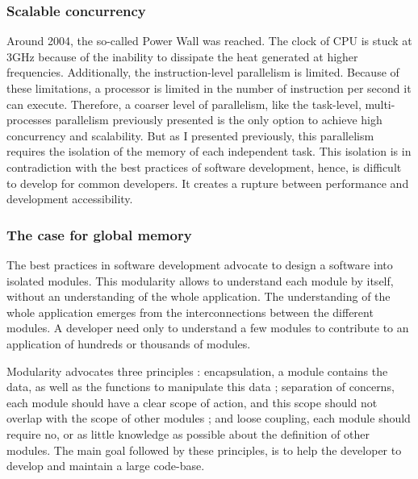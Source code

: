 
\subsubsection{Scalable concurrency}

Around 2004, the so-called Power Wall was reached.
The clock of CPU is stuck at 3GHz because of the inability to dissipate the heat generated at higher frequencies.
Additionally, the instruction-level parallelism is limited.
Because of these limitations, a processor is limited in the number of instruction per second it can execute.
Therefore, a coarser level of parallelism, like the task-level, multi-processes parallelism previously presented is the only option to achieve high concurrency and scalability.
But as I presented previously, this parallelism requires the isolation of the memory of each independent task.
This isolation is in contradiction with the best practices of software development, hence, is difficult to develop for common developers.
It creates a rupture between performance and development accessibility.

\subsubsection{The case for global memory}

The best practices in software development advocate to design a software into isolated modules.
This modularity allows to understand each module by itself, without an understanding of the whole application.
The understanding of the whole application emerges from the interconnections between the different modules.
A developer need only to understand a few modules to contribute to an application of hundreds or thousands of modules.

Modularity advocates three principles : encapsulation, a module contains the data, as well as the functions to manipulate this data ; separation of concerns, each module should have a clear scope of action, and this scope should not overlap with the scope of other modules ; and loose coupling, each module should require no, or as little knowledge as possible about the definition of other modules.
The main goal followed by these principles, is to help the developer to develop and maintain a large code-base.

